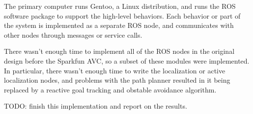 
The primary computer runs Gentoo, a Linux distribution, and runs the ROS software package to support the high-level behaviors. Each behavior or part of the system is implemented as a separate ROS node, and communicates with other nodes through messages or service calls.

There wasn't enough time to implement all of the ROS nodes in the original design before the Sparkfun AVC, so a subset of these modules were implemented. In particular, there wasn't enough time to write the localization or active localization nodes, and problems with the path planner resulted in it being replaced by a reactive goal tracking and obstable avoidance algorithm.

TODO: finish this implementation and report on the results.


